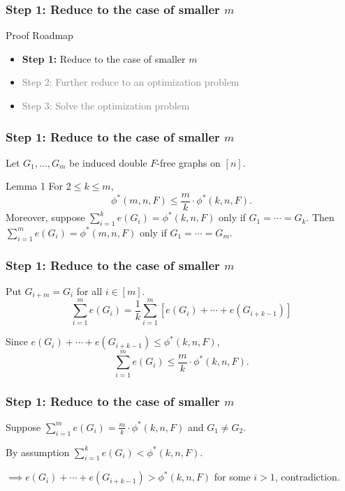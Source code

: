 \documentclass{beamer}
\begin{document}
\begin{frame}
  \frametitle{Step 1: Reduce to the case of smaller $m$}

  Proof Roadmap

  \begin{itemize}
    \item \textbf{Step 1:} Reduce to the case of smaller $m$
    \item \textcolor{gray}{Step 2: Further reduce to an optimization problem}
    \item \textcolor{gray}{Step 3: Solve the optimization problem}
  \end{itemize}
\end{frame}

\begin{frame}
  \frametitle{Step 1: Reduce to the case of smaller $m$}

  Let $G_1, \ldots, G_m$ be induced double $F$-free graphs on $[n]$.

  \begin{block}{Lemma 1}
    For $2 \leq k \leq m$,
    \[
      \phi^*(m,n,F) \leq \frac{m}{k} \cdot \phi^*(k, n, F).
    \]
    Moreover, suppose $\sum_{i = 1}^k e(G_i) = \phi^*(k, n, F)$ only if $G_1 = \cdots = G_k$. Then $\sum_{i = 1}^m e(G_i) = \phi^*(m, n, F)$ only if $G_1 = \cdots = G_m$.
  \end{block}
\end{frame}

\begin{frame}
  \frametitle{Step 1: Reduce to the case of smaller $m$}

  Put $G_{i + m} = G_i$ for all $i \in [m]$.
  \[
    \sum_{i = 1}^m e(G_i) 
    = \frac{1}{k}\sum_{i = 1}^m [e(G_i) + \cdots + e(G_{i + k - 1})]
  \]

  \pause

  Since $e(G_i) + \cdots + e(G_{i + k - 1}) \leq \phi^*(k, n, F)$,
  \[
    \sum_{i = 1}^m e(G_i) \leq \frac{m}{k} \cdot \phi^*(k, n, F).
  \]
\end{frame}

\begin{frame}
  \frametitle{Step 1: Reduce to the case of smaller $m$}

  Suppose $\sum_{i = 1}^m e(G_i) = \frac{m}{k} \cdot \phi^*(k, n, F)$ and $G_1 \neq G_2$. 

  \pause

  \vspace{0.5cm}

  By assumption $\sum_{i = 1}^k e(G_i) < \phi^*(k, n, F)$. 

  \pause

  \vspace{0.5cm}
  
  $\implies e(G_i) + \cdots + e(G_{i + k - 1}) > \phi^*(k, n, F)$ for some $i > 1$, contradiction.
\end{frame}
\end{document}
